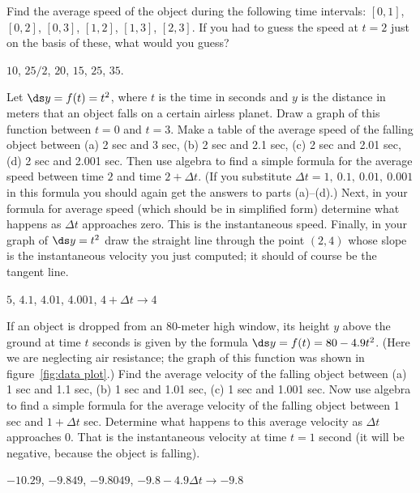 \begin{enumialphparenastyle}
\begin{ex}
Find the average speed of the object during the following time
intervals: $[0,1]$, $[0,2]$, $[0,3]$,
$[1,2]$, $[1,3]$, $[2,3]$. If you had to guess the speed at
$t=2$ just on the basis of these, what would you guess?
\begin{sol}
$10$, $25/2$, $20$, $15$, $25$, $35$.
\end{sol}
\end{ex}

\begin{ex}
Let $\ds y=f(t)=t^2$, where $t$ is the time in seconds and $y$ is the distance
in meters that an object falls on a certain airless planet.  Draw a graph
of this function between $t=0$ and $t=3$.  Make a table of the average
speed of the falling object between (a) 2 sec and 3 sec, (b) 2 sec and
2.1 sec, (c) 2 sec and 2.01 sec, (d) 2 sec and 2.001 sec.  Then use algebra
to find a simple formula for the average speed between time $2$ and time
$2+
\Delta t$.  (If you substitute $\Delta t=1,\>0.1,\>0.01,\>0.001$ in this
formula you should again get the answers to parts (a)--(d).)  Next, in your
formula for average speed (which should be in simplified form) determine
what happens as $\Delta t$ approaches zero.  This is the instantaneous
speed.  Finally, in your graph of $\ds y=t^2$ draw the straight line
through the point $(2,4)$ whose slope is the instantaneous velocity you
just computed; it should of course be the tangent line.
\begin{sol}
$5$, $4.1$, $4.01$, $4.001$, $4+\Delta t\rightarrow 4$
\end{sol}
\end{ex}

\begin{ex}
If an object is dropped from an 80-meter high window, its height $y$ above
the ground at time $t$ seconds is given by the formula $\ds y=f(t)=80-4.9t^2$.
(Here we are neglecting air resistance; the graph of this function was
shown in figure~\ref{fig:data plot}.)  Find the average velocity of
the falling object between (a) 1 sec and 1.1 sec, (b) 1 sec and 1.01 sec,
(c) 1 sec and 1.001 sec.  Now use algebra to find a simple formula for the
average velocity of the falling object between 1 sec and $1+\Delta t$ sec.
Determine what happens to this average velocity as $\Delta t$ approaches 0.
That is the instantaneous velocity at time $t=1$ second (it will be negative,
because the object is falling).
\begin{sol}
$-10.29$, $-9.849$, $-9.8049$, \hfill\break
$-9.8-4.9\Delta t\rightarrow -9.8$
\end{sol}
\end{ex}

\end{enumialphparenastyle}